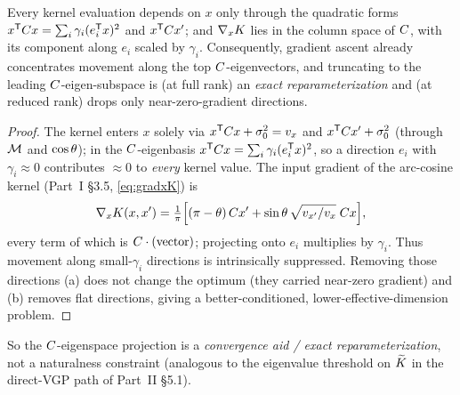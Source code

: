 \begin{proposition}\label{prop:subspace}
Every kernel evaluation depends on $x$ only through the quadratic forms
$x^{\mathsf{T}}C x=\sum_i\gamma_i(e_i^{\mathsf{T}} x)^2$ and $x^{\mathsf{T}}C x'$;
and $\nabla_xK$ lies in the column space of $C$, with its component along
$e_i$ scaled by $\gamma_i$. Consequently, gradient ascent already concentrates
movement along the top $C$-eigenvectors, and truncating to the leading
$C$-eigen-subspace is (at full rank) an \emph{exact reparameterization} and
(at reduced rank) drops only near-zero-gradient directions.
\end{proposition}
\begin{proof}
The kernel enters $x$ solely via $x^{\mathsf{T}}C x+\sigma_{0}^2=v_x$ and
$x^{\mathsf{T}}C x'+\sigma_{0}^2$ (through $\mathcal{M}$ and $\cos\theta$); in the
$C$-eigenbasis $x^{\mathsf{T}}C x=\sum_i\gamma_i(e_i^{\mathsf{T}} x)^2$, so a
direction $e_i$ with $\gamma_i\approx0$ contributes $\approx0$ to \emph{every}
kernel value. The input gradient of the arc-cosine kernel (Part~I \S3.5,
\eqref{eq:gradxK}) is
\[
  \nabla_xK(x,x')=\tfrac1\pi\Bigl[(\pi-\theta)\,C x'+\sin\theta\,\sqrt{v_{x'}/v_x}\;C x\Bigr],
\]
every term of which is $C\cdot(\text{vector})$; projecting onto $e_i$ multiplies
by $\gamma_i$. Thus movement along small-$\gamma_i$ directions is intrinsically
suppressed. Removing those directions (a) does not change the optimum (they carried
near-zero gradient) and (b) removes flat directions, giving a better-conditioned,
lower-effective-dimension problem.
\end{proof}

So the $C$-eigenspace projection is a \emph{convergence aid / exact
reparameterization}, not a naturalness constraint (analogous to the eigenvalue
threshold on $\widetilde{K}$ in the direct-VGP path of Part~II \S5.1).

